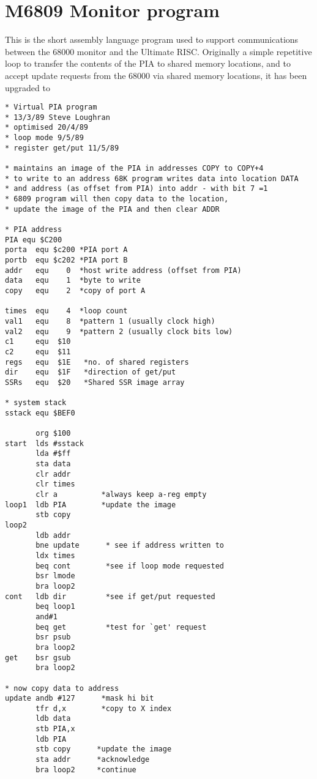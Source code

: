 \section{M6809 Monitor program}

This is the short assembly language program used  to support communications between the 68000 monitor and the Ultimate RISC.
Originally a simple repetitive loop to transfer the contents of the PIA to shared memory locations, and to accept update requests from the 68000 via shared
memory locations, it has been upgraded to 

\begin{verbatim}
* Virtual PIA program
* 13/3/89 Steve Loughran
* optimised 20/4/89
* loop mode 9/5/89
* register get/put 11/5/89

* maintains an image of the PIA in addresses COPY to COPY+4
* to write to an address 68K program writes data into location DATA
* and address (as offset from PIA) into addr - with bit 7 =1
* 6809 program will then copy data to the location, 
* update the image of the PIA and then clear ADDR

* PIA address
PIA equ $C200
porta  equ $c200 *PIA port A
portb  equ $c202 *PIA port B
addr   equ    0  *host write address (offset from PIA)
data   equ    1  *byte to write
copy   equ    2  *copy of port A

times  equ    4  *loop count
val1   equ    8  *pattern 1 (usually clock high)
val2   equ    9  *pattern 2 (usually clock bits low)
c1     equ  $10
c2     equ  $11
regs   equ  $1E   *no. of shared registers
dir    equ  $1F   *direction of get/put
SSRs   equ  $20   *Shared SSR image array

* system stack
sstack equ $BEF0

       org $100
start  lds #sstack
       lda #$ff
       sta data
       clr addr
       clr times
       clr a          *always keep a-reg empty
loop1  ldb PIA        *update the image
       stb copy
loop2  
       ldb addr
       bne update      * see if address written to
       ldx times
       beq cont        *see if loop mode requested
       bsr lmode
       bra loop2
cont   ldb dir         *see if get/put requested
       beq loop1
       and#1
       beq get         *test for `get' request
       bsr psub
       bra loop2
get    bsr gsub
       bra loop2

* now copy data to address
update andb #127      *mask hi bit
       tfr d,x        *copy to X index
       ldb data
       stb PIA,x
       ldb PIA
       stb copy      *update the image
       sta addr      *acknowledge
       bra loop2     *continue


\end{verbatim}
